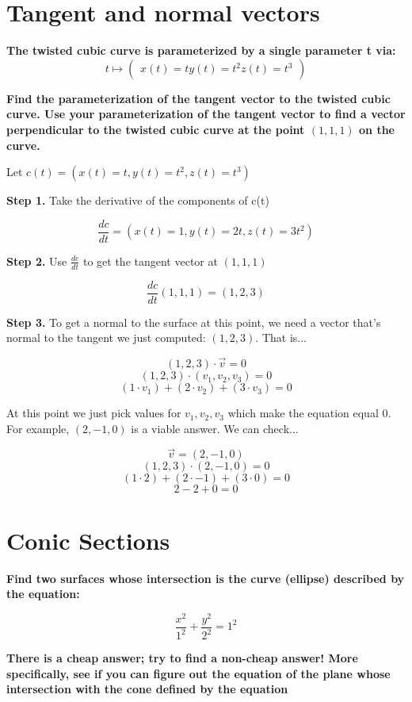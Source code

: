 \documentclass{article}
\begin{document}
\section{Tangent and normal vectors}
\textbf{The twisted cubic curve is parameterized by a single parameter t via:} 
\[
t\mapsto\left(\begin{array}{c}x(t) = t  y(t)=t^{2}   z(t)=t^{3}\end{array} \right)
\]

\textbf{Find the parameterization of the tangent vector to the twisted cubic curve. Use your parameterization of the tangent vector to find a vector perpendicular to the twisted cubic curve at the point $(1,1,1)$ on the curve.}\newline

Let $c(t)=\left(x(t) = t, y(t)=t^{2}, z(t)=t^{3}\right)$ \newline

\textbf{Step 1.} Take the derivative of the components of c(t)

\[ \frac{dc}{dt}=\left(x(t) = 1, y(t)= 2t, z(t)=3t^{2}\right) \]

\textbf{Step 2.} Use $\frac{dc}{dt}$ to get the tangent vector at $(1,1,1)$

\[\frac{dc}{dt}(1, 1, 1) = (1,2,3)\]

\textbf{Step 3.} To get a normal to the surface at this point, we need a vector that's normal to the tangent we just computed: $(1,2,3)$. That is...

\[(1,2,3)\cdot\vec{v}=0\]
\[(1,2,3)\cdot(v_1,v_2,v_3)=0\]
\[(1\cdot v_1)+(2\cdot v_2)+(3 \cdot v_3) = 0\]

At this point we just pick values for $v_1, v_2, v_3$ which make the equation equal 0. For example, $(2, -1, 0)$ is a viable answer. We can check...

\[\vec{v} = (2, -1, 0)\]
\[(1,2,3)\cdot(2, -1, 0)=0\]
\[(1\cdot2)+(2\cdot-1)+(3\cdot0)=0\]
\[2-2+0=0\]

\section{Conic Sections}
\textbf{Find two surfaces whose intersection is the curve (ellipse) described by the equation:}
    
    \[\frac{x^2}{1^2}+\frac{y^2}{2^2}=1^2\]
    
    \textbf{There is a cheap answer; try to find a non-cheap answer! More specifically, see if you can figure out the equation of the plane whose intersection with the cone defined by the equation}
    
\end{document}
